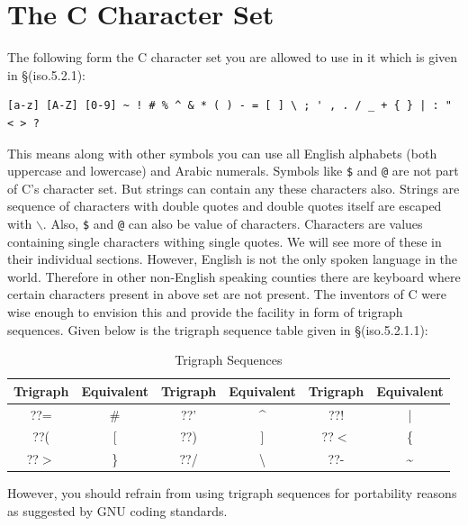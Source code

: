 \section{The C Character Set}
The following form the C character set you are allowed to use in it which is
given in \S(iso.5.2.1):

\begin{Verbatim}[frame=single]
[a-z] [A-Z] [0-9] ~ ! # % ^ & * ( ) - = [ ] \ ; ' , . / _ + { } | : " < > ?
\end{Verbatim}

This means along with other symbols you can use all English alphabets (both
uppercase and lowercase) and Arabic numerals. Symbols like \texttt{\$} and
\texttt{@} are not part of C's character set. But strings can contain any
these characters also. Strings are sequence of characters with double quotes
and double quotes itself are escaped with \texttt{$\backslash$}. Also,
\texttt{\$} and \texttt{@} can also be value of characters. Characters are
values containing single characters withing single quotes. We will see more of
these in their individual sections. However, English is not the only
spoken language in the world. Therefore in other non-English speaking counties
there are keyboard where certain characters present in above set are not
present. The inventors of C were wise enough to envision this and provide the
facility in form of trigraph sequences. Given below is the trigraph sequence
table given in \S(iso.5.2.1.1):

\begin{table}[H]
 \begin{center}
 \caption{Trigraph Sequences}
\begin{tabular}{|c|c|c|c|c|c|}
\hline
\textbf{Trigraph}&\textbf{Equivalent}&\textbf{Trigraph}&\textbf{Equivalent}&\textbf{Trigraph}&\textbf{Equivalent}\\
\hline
??=&\#&??'&\textasciicircum&??!&|\\
\hline
??(&[&??)&]&??$<$&\{\\
\hline
??$>$&\}&??/&\textbackslash&??-&\textasciitilde\\
\hline
\end{tabular}
\end{center}
\end{table}

However, you should refrain from using trigraph sequences for portability 
reasons as suggested by GNU coding standards.


